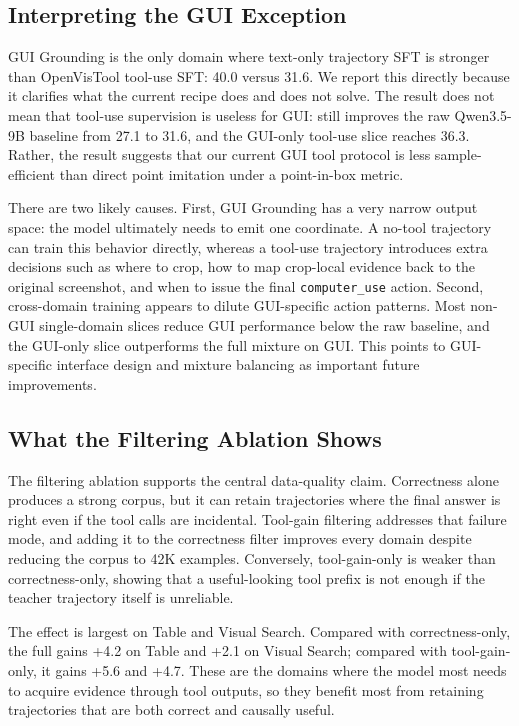 \subsection{Interpreting the GUI Exception}
\label{sec:gui_exception}

GUI Grounding is the only domain where text-only trajectory SFT is stronger than OpenVisTool tool-use SFT: 40.0 versus 31.6. We report this directly because it clarifies what the current recipe does and does not solve. The result does not mean that tool-use supervision is useless for GUI: \dataset still improves the raw Qwen3.5-9B baseline from 27.1 to 31.6, and the GUI-only tool-use slice reaches 36.3. Rather, the result suggests that our current GUI tool protocol is less sample-efficient than direct point imitation under a point-in-box metric.

There are two likely causes. First, GUI Grounding has a very narrow output space: the model ultimately needs to emit one coordinate. A no-tool trajectory can train this behavior directly, whereas a tool-use trajectory introduces extra decisions such as where to crop, how to map crop-local evidence back to the original screenshot, and when to issue the final \texttt{computer\_use} action. Second, cross-domain training appears to dilute GUI-specific action patterns. Most non-GUI single-domain slices reduce GUI performance below the raw baseline, and the GUI-only slice outperforms the full mixture on GUI. This points to GUI-specific interface design and mixture balancing as important future improvements.

\subsection{What the Filtering Ablation Shows}
\label{sec:filtering_discussion}

The filtering ablation supports the central data-quality claim. Correctness alone produces a strong corpus, but it can retain trajectories where the final answer is right even if the tool calls are incidental. Tool-gain filtering addresses that failure mode, and adding it to the correctness filter improves every domain despite reducing the corpus to 42K examples. Conversely, tool-gain-only is weaker than correctness-only, showing that a useful-looking tool prefix is not enough if the teacher trajectory itself is unreliable.

The effect is largest on Table and Visual Search. Compared with correctness-only, the full \dataset gains +4.2 on Table and +2.1 on Visual Search; compared with tool-gain-only, it gains +5.6 and +4.7. These are the domains where the model most needs to acquire evidence through tool outputs, so they benefit most from retaining trajectories that are both correct and causally useful.

